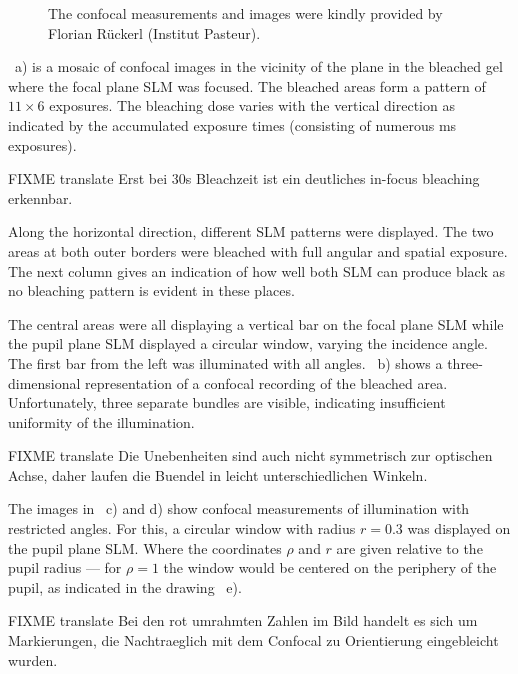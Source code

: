\begin{figure}[htbp]
  \centering
  \caption{The confocal measurements and images were kindly provided
    by Florian R\"uckerl (Institut Pasteur).}
  \label{fig:overview-bleach}
\end{figure}

~a) is a mosaic of confocal images in the
vicinity of the plane in the bleached gel where the focal plane SLM
was focused. The bleached areas form a pattern of $11\times 6$
exposures. The bleaching dose varies with the vertical direction as
indicated by the accumulated exposure times (consisting of numerous
\unit[20]{ms} exposures). 

FIXME translate
Erst bei 30s Bleachzeit ist ein deutliches in-focus bleaching erkennbar. 


Along the horizontal direction, different SLM patterns were
displayed. The two areas at both outer borders were bleached with full
angular and spatial exposure. The next column gives an indication of
how well both SLM can produce black as no bleaching pattern is evident
in these places.

The  central areas were all
displaying a vertical bar on the focal plane SLM while the pupil plane
SLM displayed a circular window, varying the incidence angle. The
first bar from the left was illuminated with all
angles. ~b) shows a three-dimensional
representation of a confocal recording of the bleached
area. Unfortunately, three separate bundles are visible, indicating
insufficient uniformity of the illumination.

FIXME translate Die Unebenheiten sind auch nicht symmetrisch zur
optischen Achse, daher laufen die Buendel in leicht unterschiedlichen
Winkeln.

The images in ~c) and d) show confocal
measurements of illumination with restricted angles. For this, a
circular window with radius $r=0.3$ was displayed on the pupil plane
SLM. Where the coordinates $\rho$ and $r$ are given relative to the
pupil radius --- for $\rho=1$ the window would be centered on the
periphery of the pupil, as indicated in the drawing
~e).

FIXME translate Bei den rot umrahmten Zahlen im Bild handelt es sich
um Markierungen, die Nachtraeglich mit dem Confocal zu Orientierung
eingebleicht wurden.



